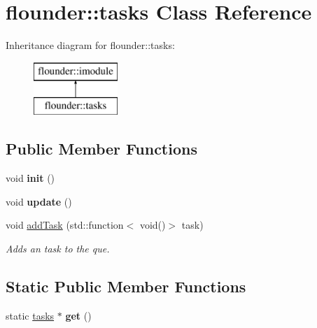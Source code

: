 \hypertarget{classflounder_1_1tasks}{}\section{flounder\+:\+:tasks Class Reference}
\label{classflounder_1_1tasks}
Inheritance diagram for flounder\+:\+:tasks\+:\begin{figure}[H]
\begin{center}
\leavevmode
\includegraphics[height=2.000000cm]{classflounder_1_1tasks}
\end{center}
\end{figure}
\subsection*{Public Member Functions}
\begin{DoxyCompactItemize}
\item 
\mbox{\label{classflounder_1_1tasks_acec6c6fe6965425eadea1905c300de98}} 
void {\bfseries init} ()
\item 
\mbox{\label{classflounder_1_1tasks_ab52970282403f36b8f905b9c9fd47b21}} 
void {\bfseries update} ()
\item 
void \hyperlink{classflounder_1_1tasks_a4c162853b207b90c2686ce0eb9dc9265}{add\+Task} (std\+::function$<$ void()$>$ task)
\begin{DoxyCompactList}\small\item\em Adds an task to the que. \end{DoxyCompactList}\end{DoxyCompactItemize}
\subsection*{Static Public Member Functions}
\begin{DoxyCompactItemize}
\item 
\mbox{\label{classflounder_1_1tasks_a24877315f9d4a52671f5d62ea40d83ec}} 
static \hyperlink{classflounder_1_1tasks}{tasks} $\ast$ {\bfseries get} ()
\end{DoxyCompactItemize}
